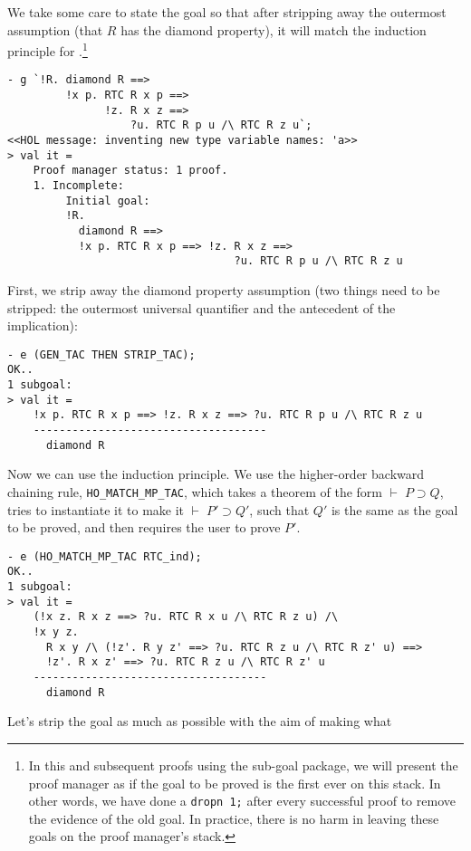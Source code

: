 We take some care to state the goal so that after stripping away the
outermost assumption (that $R$ has the diamond property), it will match the
induction principle for .\footnote{In this and subsequent
  proofs using the sub-goal package, we will present the proof manager
  as if the goal to be proved is the first ever on this stack.  In
  other words, we have done a \texttt{dropn 1;} after every successful
  proof to remove the evidence of the old goal.  In practice, there is
  no harm in leaving these goals on the proof manager's stack.}
\begin{session}\begin{verbatim}
- g `!R. diamond R ==>
         !x p. RTC R x p ==>
               !z. R x z ==>
                   ?u. RTC R p u /\ RTC R z u`;
<<HOL message: inventing new type variable names: 'a>>
> val it =
    Proof manager status: 1 proof.
    1. Incomplete:
         Initial goal:
         !R.
           diamond R ==>
           !x p. RTC R x p ==> !z. R x z ==>
                                   ?u. RTC R p u /\ RTC R z u
\end{verbatim}\end{session}
First, we strip away the diamond property assumption (two things need to
be stripped: the outermost universal quantifier and the antecedent of
the implication):
\begin{session}\begin{verbatim}
- e (GEN_TAC THEN STRIP_TAC);
OK..
1 subgoal:
> val it =
    !x p. RTC R x p ==> !z. R x z ==> ?u. RTC R p u /\ RTC R z u
    ------------------------------------
      diamond R
\end{verbatim}\end{session}
Now we can use the induction principle.  We use the higher-order
backward chaining rule, \texttt{HO\_MATCH\_MP\_TAC}, which takes a
theorem of the form $\vdash\;P\supset Q$, tries to instantiate it to
make it $\vdash\;P'\supset Q'$, such that $Q'$ is the same as the goal
to be proved, and then requires the user to prove $P'$.
\begin{session}\begin{verbatim}
- e (HO_MATCH_MP_TAC RTC_ind);
OK..
1 subgoal:
> val it =
    (!x z. R x z ==> ?u. RTC R x u /\ RTC R z u) /\
    !x y z.
      R x y /\ (!z'. R y z' ==> ?u. RTC R z u /\ RTC R z' u) ==>
      !z'. R x z' ==> ?u. RTC R z u /\ RTC R z' u
    ------------------------------------
      diamond R
\end{verbatim}\end{session}
Let's strip the goal as much as possible with the aim of making what
